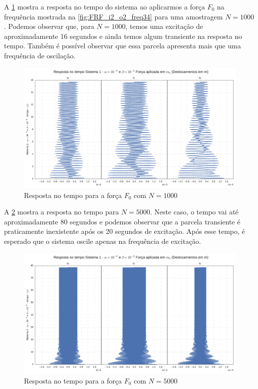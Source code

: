 A \cref{fig:F0_1000_tempo} mostra a resposta no tempo do sistema ao aplicarmos a força $F_0$ na frequência mostrada na \cref{fig:FRF_i2_o2_freq34} para uma amostragem $N = 1000$. Podemos observar que, para $N=1000$, temos uma excitação de aproximadamente 16 segundos e ainda temos algum transiente na resposta no tempo. Também é possível observar que essa parcela apresenta mais que uma frequência de oscilação.

\begin{figure}
	\centering
	\includegraphics[scale=0.6]{IMGS/F0_1000_tempo.pdf}
	\caption{Resposta no tempo para a força $F_0$ com $N=1000$}
	\label{fig:F0_1000_tempo}
\end{figure}

A \cref{fig:F0_5000_tempo} mostra a resposta no tempo para $N=5000$. Neste caso, o tempo vai até aproximadamente 80 segundos e podemos observar que a parcela transiente é praticamente inexistente após os 20 segundos de excitação. Após esse tempo, é esperado que o sistema oscile apenas na frequência de excitação.

\begin{figure}
	\centering
	\includegraphics[scale=0.6]{IMGS/F0_5000_tempo.pdf}
	\caption{Resposta no tempo para a força $F_0$ com $N=5000$}
	\label{fig:F0_5000_tempo}
\end{figure}

